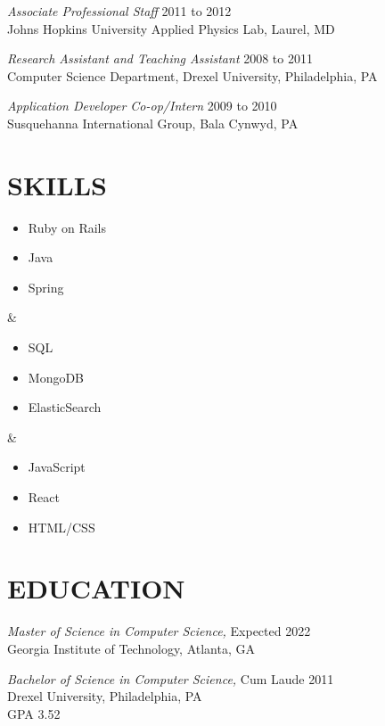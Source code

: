 \documentclass[line]{style}
\begin{document}
\begin{resume}
{\sl Associate Professional Staff} \hfill 2011 to 2012 \\
Johns Hopkins University Applied Physics Lab, Laurel, MD

{\sl Research Assistant and Teaching Assistant} \hfill 2008 to 2011 \\
Computer Science Department, Drexel University, Philadelphia, PA

{\sl Application Developer Co-op/Intern} \hfill        2009 to 2010 \\
Susquehanna International Group, Bala Cynwyd, PA

\section{SKILLS}
\begin{ncolumn}{3}
\begin{itemize} \itemsep -2pt
\item Ruby on Rails
\item Java
\item Spring
\end{itemize}
&
\begin{itemize} \itemsep -2pt
\item SQL
\item MongoDB
\item ElasticSearch
\end{itemize}
&
\begin{itemize} \itemsep -2pt
\item JavaScript
\item React
\item HTML/CSS
\end{itemize}
\end{ncolumn}

\section{EDUCATION}
{\sl Master of Science in Computer Science,} \hfill Expected 2022 \\
Georgia Institute of Technology, Atlanta, GA

{\sl Bachelor of Science in Computer Science,} Cum Laude \hfill 2011 \\
Drexel University, Philadelphia, PA \\
GPA 3.52

\end{resume}
\end{document}
